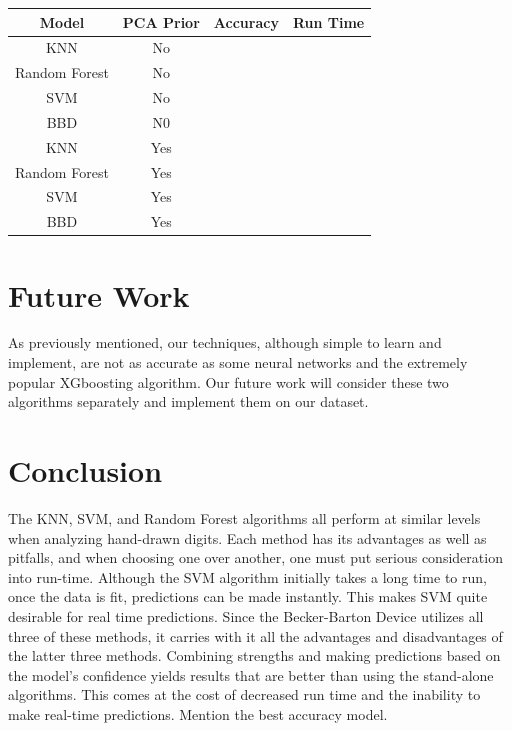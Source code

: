 \documentclass[11pt, oneside]{article}   	%
\begin{document}
\begin{center}
\begin{tabular}{ |c|c|c|c| } 
\hline
Model & PCA Prior & Accuracy & Run Time\\
 \hline \hline
  KNN & No &  & \\ 
Random Forest & No &  & \\ 
 SVM & No &  & \\ 
 BBD & N0 &  & \\
 \hline
 KNN & Yes &  & \\ 
Random Forest & Yes &  & \\ 
 SVM & Yes &  & \\ 
 BBD & Yes &  & \\
 \hline
\end{tabular}
\end{center}
\section{Future Work}
As previously mentioned, our techniques, although simple to learn and implement, are not as accurate as some neural networks and the extremely popular XGboosting algorithm. Our future work will consider these two algorithms separately and implement them on our dataset. 

\section{Conclusion}
The KNN, SVM, and Random Forest algorithms all perform at similar levels when analyzing hand-drawn digits. Each method has its advantages as well as pitfalls, and when choosing one over another, one must put serious consideration into run-time. Although the SVM algorithm initially takes a long time to run, once the data is fit, predictions can be made instantly. This makes SVM quite desirable for real time predictions. Since the Becker-Barton Device utilizes all three of these methods, it carries with it all the advantages and disadvantages of the latter three methods. Combining strengths and making predictions based on the model's confidence yields results that are better than using the stand-alone algorithms. This comes at the cost of decreased run time and the inability to make real-time predictions. Mention the best accuracy model. 

\end{document}
